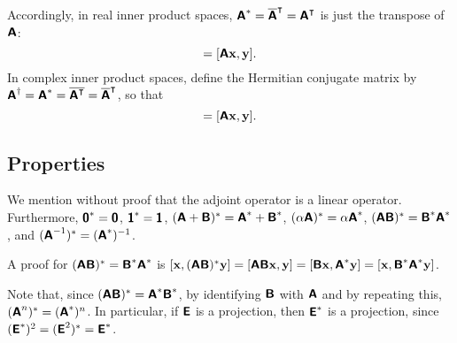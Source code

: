 Accordingly, in real inner product spaces,
$\textsf{\textbf{A}}^\ast= \overline{\textsf{\textbf{A}}}^\intercal  =  \textsf{\textbf{A}}^\intercal $ is just the transpose of $\textsf{\textbf{A}}$:
\begin{equation}
[{\bf x},\textsf{\textbf{A}}^\intercal {\bf y}]=
[\textsf{\textbf{A}}{\bf x},{\bf y}].
\end{equation}
In complex inner product spaces,
define the Hermitian conjugate matrix by
$\textsf{\textbf{\textsf{\textbf{A}}}}^\dagger = \textsf{\textbf{A}}^\ast =\overline{\textsf{\textbf{A}}^\intercal } = \overline{\textsf{\textbf{A}}}^\intercal $, so that
\begin{equation}
[{\bf x},\textsf{\textbf{A}}^\dagger{\bf y}]=
[\textsf{\textbf{A}}{\bf x},{\bf y}].
\end{equation}


\subsection{Properties}
We mention without proof that the adjoint operator is a linear operator.
Furthermore,
$\textsf{\textbf{0}}^\ast = \textsf{\textbf{0}}$,
$\textsf{\textbf{1}}^\ast = \textsf{\textbf{1}}$,
$(\textsf{\textbf{A}}+\textsf{\textbf{B}})^\ast = \textsf{\textbf{A}}^\ast+\textsf{\textbf{B}}^\ast$,
$(\alpha \textsf{\textbf{A}})^\ast = \alpha \textsf{\textbf{A}}^\ast$,
$( \textsf{\textbf{A}}\textsf{\textbf{B}})^\ast =   \textsf{\textbf{B}}^\ast
 \textsf{\textbf{A}}^\ast$,
and
$( \textsf{\textbf{A}}^{-1})^\ast
=
( \textsf{\textbf{A}}^\ast )^{-1}
$.

{\color{OliveGreen}\bproof
A proof for
$( \textsf{\textbf{A}}\textsf{\textbf{B}})^\ast =   \textsf{\textbf{B}}^\ast  \textsf{\textbf{A}}^\ast
$
is
$
[{\bf x},(\textsf{\textbf{A}}\textsf{\textbf{B}})^\ast {\bf y}]
=
[\textsf{\textbf{A}}\textsf{\textbf{B}}{\bf x}, {\bf y}]
=
[\textsf{\textbf{B}}{\bf x}, \textsf{\textbf{A}}^\ast{\bf y}]
=
[{\bf x}, \textsf{\textbf{B}}^\ast\textsf{\textbf{A}}^\ast{\bf y}]
$.
\eproof
}

Note that, since
$
( \textsf{\textbf{A}}\textsf{\textbf{B}})^\ast = \textsf{\textbf{A}}^\ast   \textsf{\textbf{B}}^\ast
$, by identifying $\textsf{\textbf{B}}$ with $\textsf{\textbf{A}}$  and by repeating this,
$( \textsf{\textbf{A}}^n)^\ast =  (\textsf{\textbf{A}}^\ast)^n$.
In particular, if
$\textsf{\textbf{E}}$
is a projection,
then
$\textsf{\textbf{E}}^\ast$ is a projection, since
$ (\textsf{\textbf{E}}^\ast)^2 =  ( \textsf{\textbf{E}}^2)^\ast  =\textsf{\textbf{E}}^\ast$.

